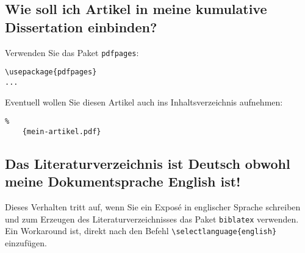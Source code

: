 \subsection*{Wie soll ich Artikel in meine kumulative Dissertation einbinden?}

Verwenden Sie das Paket \verb|pdfpages|:
\begin{verbatim}
\usepackage{pdfpages}
...

\end{verbatim}
Eventuell wollen Sie diesen Artikel auch ins Inhaltsverzeichnis aufnehmen:
\begin{verbatim}
%
    {mein-artikel.pdf}
\end{verbatim}

\subsection*{Das Literaturverzeichnis ist Deutsch obwohl meine Dokumentsprache
  English ist!}

Dieses Verhalten tritt auf, wenn Sie ein Exposé in englischer Sprache schreiben
und zum Erzeugen des Literaturverzeichnisses das Paket \verb|biblatex|
verwenden. Ein Workaround ist, direkt nach \verb|| den Befehl
  \verb|\selectlanguage{english}| einzufügen.
